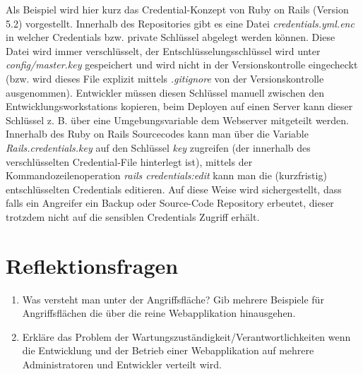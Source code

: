 Als Beispiel wird hier kurz das Credential-Konzept von Ruby on Rails (Version 5.2) vorgestellt. Innerhalb des Repositories gibt es eine Datei \textit{credentials.yml.enc} in welcher Credentials bzw. private Schlüssel abgelegt werden können. Diese Datei wird immer verschlüsselt, der Entschlüsselungsschlüssel wird unter \textit{config/master.key} gespeichert und wird nicht in der Versionskontrolle eingecheckt (bzw. wird dieses File explizit mittels \textit{.gitignore} von der Versionskontrolle ausgenommen). Entwickler müssen diesen Schlüssel manuell zwischen den Entwicklungsworkstations kopieren, beim Deployen auf einen Server kann dieser Schlüssel z. B. über eine Umgebungsvariable dem Webserver mitgeteilt werden. Innerhalb des Ruby on Rails Sourcecodes kann man über die Variable \textit{Rails.credentials.key} auf den Schlüssel \textit{key} zugreifen (der innerhalb des verschlüsselten Credential-File hinterlegt ist), mittels der Kommandozeilenoperation \textit{rails credentials:edit} kann man die (kurzfristig) entschlüsselten Credentials editieren. Auf diese Weise wird sichergestellt, dass falls ein Angreifer ein Backup oder Source-Code Repository erbeutet, dieser trotzdem nicht auf die sensiblen Credentials Zugriff erhält.

\section{Reflektionsfragen}

\begin{enumerate}
	\item Was versteht man unter der Angriffsfläche? Gib mehrere Beispiele für Angriffsflächen die über die reine Webapplikation hinausgehen.
	\item Erkläre das Problem der Wartungszuständigkeit/Verantwortlichkeiten wenn die Entwicklung und der Betrieb einer Webapplikation auf mehrere Administratoren und Entwickler verteilt wird.
\end{enumerate}

